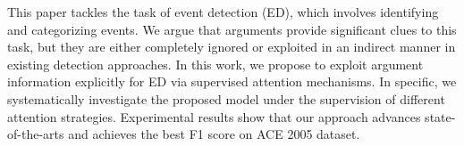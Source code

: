 This paper tackles the task of event detection (ED), which involves identifying and categorizing events. We argue that arguments provide significant clues to this task, but they are either completely ignored or exploited in an indirect manner in existing detection approaches. In this work, we propose to exploit argument information explicitly for ED via supervised attention mechanisms. In specific, we systematically investigate the proposed model under the supervision of different attention strategies. Experimental results show that our approach advances state-of-the-arts and achieves the best F1 score on ACE 2005 dataset.
